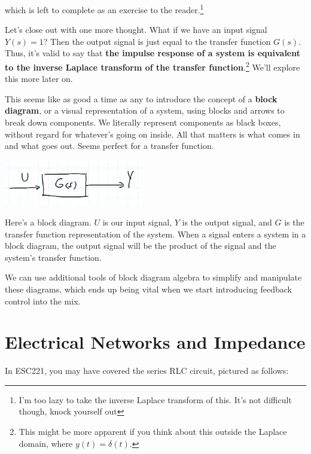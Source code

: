 \documentclass{report}
\begin{document}
\begin{onehalfspacing}
\begin{flushleft}
which is left to complete as an exercise to the reader.\footnote{I'm too lazy to take the inverse Laplace transform of this. It's not difficult though, knock yourself out}

\medskip

Let's close out with one more thought. What if we have an input signal \(Y(s) = 1\)? Then the output signal is just equal to the transfer function \(G(s)\). Thus, it's valid to say that \textbf{the impulse response of a system is equivalent to the inverse Laplace transform of the transfer function}.\footnote{This might be more apparent if you think about this outside the Laplace domain, where \(y(t) = \delta(t)\).} We'll explore this more later on.

\medskip

This seems like as good a time as any to introduce the concept of a \textbf{block diagram}, or a visual representation of a system, using blocks and arrows to break down components. We literally represent components as black boxes, without regard for whatever's going on inside. All that matters is what comes in and what goes out. Seems perfect for a transfer function.

\begin{center}
    {\includegraphics[height=2cm]{6_bd}}
\end{center}

Here's a block diagram. \(U\) is our input signal, \(Y\) is the output signal, and \(G\) is the transfer function representation of the system. When a signal enters a system in a block diagram, the output signal will be the product of the signal and the system's transfer function.

\medskip

We can use additional tools of block diagram algebra to simplify and manipulate these diagrams, which ends up being vital when we start introducing feedback control into the mix.

\section{Electrical Networks and Impedance}

In ESC221, you may have covered the series RLC circuit, pictured as follows:


\end{flushleft}
\end{onehalfspacing}
\end{document}
